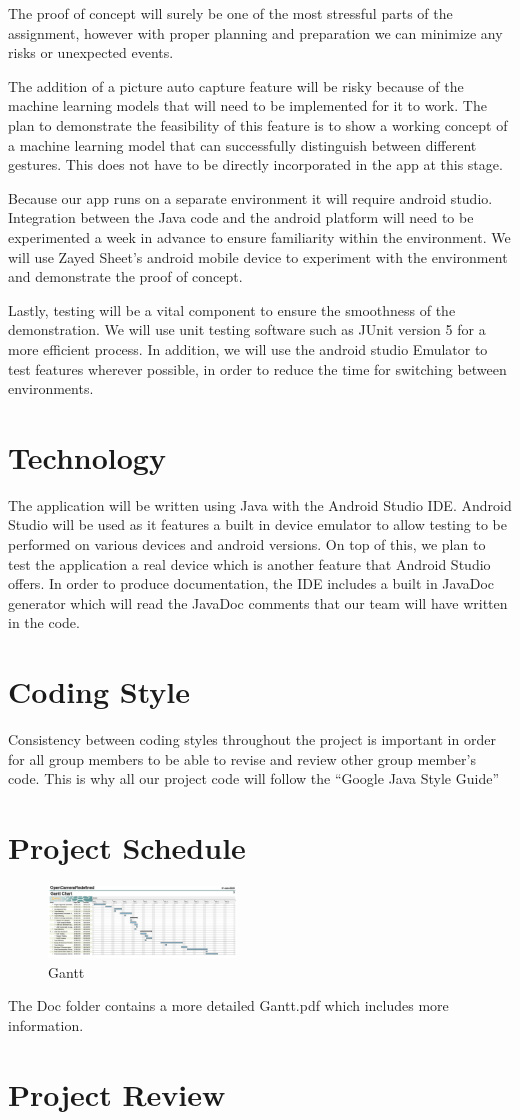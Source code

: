 \documentclass{article}
\begin{document}
The proof of concept will surely be one of the most stressful parts of the assignment, however with proper planning and preparation we can minimize any risks or unexpected events. 

The addition of a picture auto capture feature will be risky because of the machine learning models that will need to be implemented for it to work. The plan to demonstrate the feasibility of this feature is to show a working concept of a machine learning model that can successfully distinguish between different gestures. This does not have to be directly incorporated in the app at this stage.

Because our app runs on a separate environment it will require android studio. Integration between the Java code and the android platform will need to be experimented a week in advance to ensure familiarity within the environment. We will use Zayed Sheet’s android mobile device to experiment with the environment and demonstrate the proof of concept. 

Lastly, testing will be a vital component to ensure the smoothness of the demonstration. We will use unit testing software such as JUnit version 5 for a more efficient process. In addition, we will use the android studio Emulator to test features wherever possible, in order to reduce the time for switching between environments. 


\section{Technology}

The application will be written using Java with the Android Studio IDE. Android Studio will be used as it features a built in device emulator to allow testing to be performed on various devices and android versions. On top of this, we plan to test the application a real device which is another feature that Android Studio offers. In order to produce documentation, the IDE includes a built in JavaDoc generator which will read the JavaDoc comments that our team will have written in the code.

\section{Coding Style}

Consistency between coding styles throughout the project is important in order for all group members to be able to revise and review other group member’s code. This is why all our project code will follow the “Google Java Style Guide”

\section{Project Schedule}

\begin{figure}[h!]
\centering
\includegraphics[width=50mm, scale = 2]{Gantt}
\caption{Gantt}
\label{fig:method}
\end{figure}
The Doc folder contains a more detailed Gantt.pdf which includes more information. 

\section{Project Review}
\end{document}
